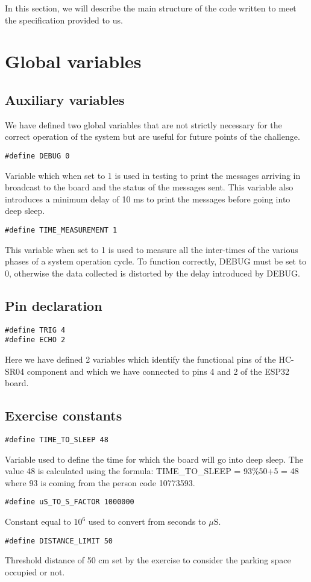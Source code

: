 In this section, we will describe the main structure of the code written to meet the specification provided to us.
\section{Global variables}
\subsection{Auxiliary variables}
We have defined two global variables that are not strictly necessary for the correct operation of the system but are useful for future points of the challenge.
\begin{verbatim}
#define DEBUG 0
\end{verbatim}
Variable which when set to 1 is used in testing to print the messages arriving in broadcast to the board and the status of the messages sent. This variable also introduces a minimum delay of 10 ms to print the messages before going into deep sleep.\\
\begin{verbatim}
#define TIME_MEASUREMENT 1
\end{verbatim}
This variable when set to 1 is used to measure all the inter-times of the various phases of a system operation cycle. To function correctly, DEBUG must be set to 0, otherwise the data collected is distorted by the delay introduced by DEBUG.


\subsection{Pin declaration}
\begin{verbatim}
#define TRIG 4
#define ECHO 2
\end{verbatim}
Here we have defined 2 variables which identify the functional pins of the HC-SR04 component and which we have connected to pins 4 and 2 of the ESP32 board.

\subsection{Exercise constants}
\begin{verbatim}
#define TIME_TO_SLEEP 48
\end{verbatim}
Variable used to define the time for which the board will go into deep sleep. The value 48 is calculated using the formula: TIME\_TO\_SLEEP = 93\%50+5 = 48 \\
where 93 is coming from the person code 10773593. \\
\begin{verbatim}
#define uS_TO_S_FACTOR 1000000
\end{verbatim}
Constant equal to $10^6$ used to convert from seconds to $\mu\text{S}$.\\
\begin{verbatim}
#define DISTANCE_LIMIT 50
\end{verbatim}
Threshold distance of 50 cm set by the exercise to consider the parking space occupied or not.



